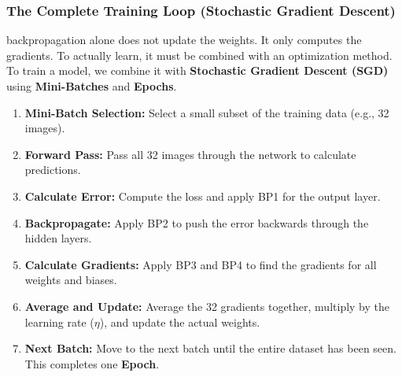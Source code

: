 \documentclass[11pt]{article}
\theoremstyle{smallexample}
\begin{document}
\subsubsection{The Complete Training Loop (Stochastic Gradient Descent)}
 backpropagation alone does not update the weights. It only computes the gradients. To actually learn, it must be combined with an optimization method. To train a model, we combine it with \textbf{Stochastic Gradient Descent (SGD)} using \textbf{Mini-Batches} and \textbf{Epochs}.

\begin{enumerate}
    \item \textbf{Mini-Batch Selection:} Select a small subset of the training data (e.g., 32 images).
    \item \textbf{Forward Pass:} Pass all 32 images through the network to calculate predictions.
    \item \textbf{Calculate Error:} Compute the loss and apply BP1 for the output layer.
    \item \textbf{Backpropagate:} Apply BP2 to push the error backwards through the hidden layers.
    \item \textbf{Calculate Gradients:} Apply BP3 and BP4 to find the gradients for all weights and biases.
    \item \textbf{Average and Update:} Average the 32 gradients together, multiply by the learning rate ($\eta$), and update the actual weights.
    \item \textbf{Next Batch:} Move to the next batch until the entire dataset has been seen. This completes one \textbf{Epoch}.
\end{enumerate}


\pagebreak
\end{document}
